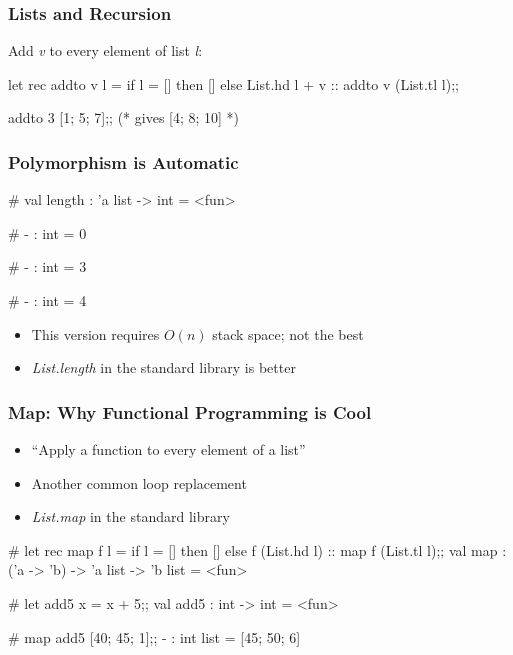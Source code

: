 \documentclass{plt}
\begin{document}

\begin{frame}[fragile]
  \frametitle{Lists and Recursion}

Add \emph{v} to every element of list \emph{l}:

\begin{ocaml}
let rec addto v l =
  if l = [] then [] else
  List.hd l + v :: addto v (List.tl l);;

addto 3 [1; 5; 7];; (* gives [4; 8; 10] *)
\end{ocaml}
\end{frame}

\begin{frame}[fragile]
  \frametitle{Polymorphism is Automatic}
\begin{interactive}
# 
val length : 'a list -> int = <fun>

# 
- : int = 0

# 
- : int = 3

# 
- : int = 4
\end{interactive}

\begin{itemize}
\item This version requires $O(n)$ stack space; not the best
\item \emph{List.length} in the standard library is better
\end{itemize}
\end{frame}

\begin{frame}[fragile]
  \frametitle{Map: Why Functional Programming is Cool}

\begin{itemize}
\item ``Apply a function to every element of a list''
\item Another common loop replacement
\item \emph{List.map} in the standard library
\end{itemize}

\begin{semiverbatim}
# \alert{let rec map f l =}
  \alert{if l = [] then [] else}
  \alert{f (List.hd l) :: map f (List.tl l);;}
    val map : ('a -> 'b) -> 'a list -> 'b list = <fun>

# \alert{let add5 x = x + 5;;}
val add5 : int -> int = <fun>

# \alert{map add5 [40; 45; 1];;}
- : int list = [45; 50; 6]
\end{semiverbatim}
\end{frame}
\end{document}
